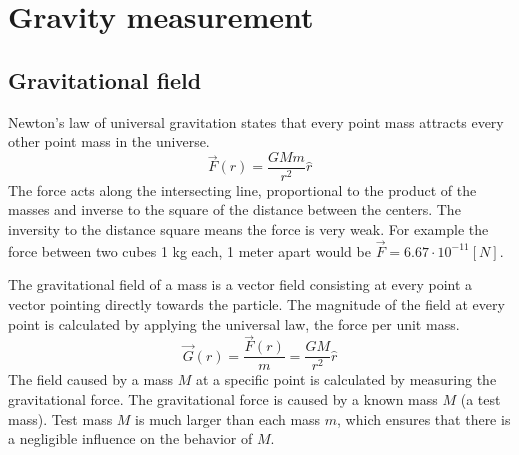 \documentclass[\main/master.tex]{subfiles}
\begin{document}
\section{Gravity measurement}

\subsection{Gravitational field}
Newton's law of universal gravitation states that every point mass attracts every other point mass in the universe.
\begin{equation}
\overrightarrow{F}(r) = \frac{GMm}{r^2}\hat{r}    \label{eqn:gravitation_force}
\end{equation} 
The force acts along the intersecting line, proportional to the product of the masses and inverse to the square of the distance between the centers. The inversity to the distance square means the force is very weak. For example the force between two cubes 1 kg each, 1 meter apart would be $\overrightarrow{F} = 6.67\cdot10^{-11} [N]$.
\par\noindent
The gravitational field of a mass is a vector field consisting at every point a vector pointing directly towards the particle. The magnitude of the field at every point is calculated by applying the universal law, the force per unit mass. 
\begin{equation}
\overrightarrow{G}(r) = \frac{\overrightarrow{F}(r)}{m} = \frac{GM}{r^2}\hat{r}    \label{eqn:gravitation_field}
\end{equation}
The field caused by a mass $M$ at a specific point is calculated by measuring the gravitational force. The gravitational force is caused by a known mass $M$ (a test mass). Test mass $M$ is much larger than each mass $m$, which ensures that there is a negligible influence on the behavior of $M$.  
\end{document}
